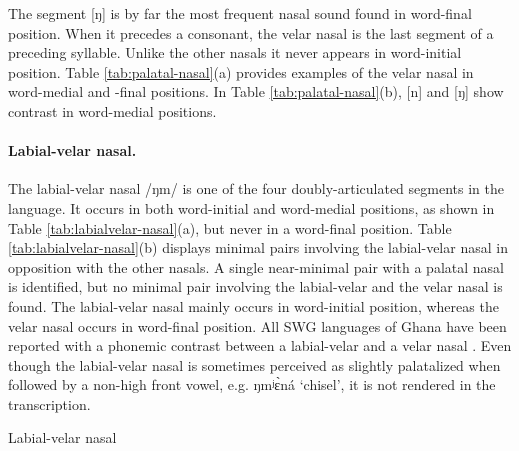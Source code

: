 The segment [{ŋ}] is by far 
the most frequent nasal sound found in word-final position.  When it precedes a 
consonant, the velar nasal is  the last segment of  a preceding syllable.  
Unlike the other nasals it never appears in word-initial position. Table 
\ref{tab:palatal-nasal}(a)  provides  examples of the velar nasal in word-medial 
and -final positions. In Table \ref{tab:palatal-nasal}(b),   [{n}] and 
[{ŋ}] show contrast in word-medial  positions. 
 



 

\paragraph{Labial-velar nasal.}


The labial-velar nasal /{ŋm}/ is one of the four doubly-articulated 
segments in 
the language. It occurs in both word-initial and word-medial positions, as shown 
in Table \ref{tab:labialvelar-nasal}(a),  but  never in a word-final position. 
Table \ref{tab:labialvelar-nasal}(b) displays  minimal pairs involving the 
labial-velar nasal  in opposition with the other nasals. A single near-minimal 
pair with a palatal nasal is identified, but no minimal pair involving the 
labial-velar and the velar  nasal is found. The labial-velar nasal   mainly 
occurs in word-initial position, whereas the velar nasal occurs  in word-final 
position.  All SWG languages of Ghana have been reported with a phonemic contrast  between a labial-velar and a velar nasal \citep{Crou66, Gray69,  Toup95, Crou03}. Even though the labial-velar nasal is sometimes perceived as slightly palatalized when followed by a non-high front vowel, e.g. {\sls ŋmʲɛ̀ná} `chisel', it is not rendered in the transcription.
 
\begin{table}


\caption{Labial-velar nasal\label{tab:labialvelar-nasal}}

\quad
{}
\end{table}


